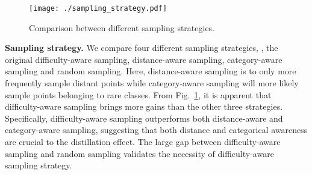 \begin{figure}[t]
 \centering
 \texttt{[image: ./sampling\_strategy.pdf]}
 \vskip -0.2cm
 \caption{Comparison between different sampling strategies.}
 \centering
 \vskip -0.5cm
 \label{fig:sampling_compare}
\end{figure}

\noindent \textbf{Sampling strategy.} We compare four different sampling strategies, \ie, the original difficulty-aware sampling, distance-aware sampling, category-aware sampling and random sampling. Here, distance-aware sampling is to only more frequently sample distant points while category-aware sampling will more likely sample points belonging to rare classes. From Fig.~\ref{fig:sampling_compare}, it is apparent that difficulty-aware sampling brings more gains than the other three strategies. Specifically, difficulty-aware sampling outperforms both distance-aware and category-aware sampling, suggesting that both distance and categorical awareness are crucial to the distillation effect. The large gap between difficulty-aware sampling and random sampling validates the necessity of difficulty-aware sampling strategy. 
